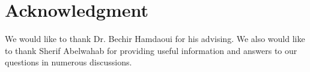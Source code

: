 \documentclass[12pt,journal]{IEEEtran}
\begin{document}

%



\section*{Acknowledgment}
We would like to thank Dr. Bechir Hamdaoui for his advising. We also would like to thank Sherif Abelwahab for providing useful information and answers to our questions in numerous discussions.



\ifCLASSOPTIONcaptionsoff
  \newpage
\fi




%
%

{}

\end{document}
